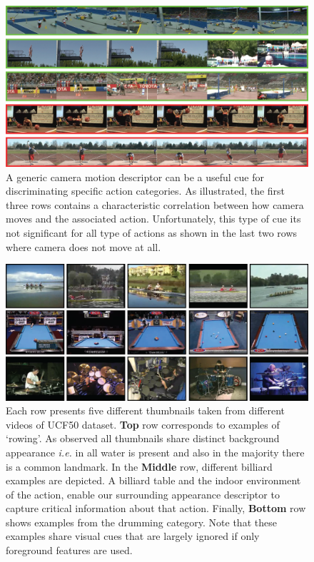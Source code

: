 \documentclass[runningheads]{llncs}
\begin{document}
\begin{figure}[t!]
\begin{center}
\includegraphics[width=0.98\linewidth]{cam_motion.png}
\end{center}
\caption{A generic camera motion descriptor can be a useful cue for discriminating specific action categories. As illustrated, the first three rows contains a characteristic correlation between how camera moves and the associated action. Unfortunately, this type of cue its not significant for all type of actions as shown in the last two rows where camera does not move at all.}
\label{fig:camMotion_example}
\end{figure}

\begin{figure}[t!]
\begin{center}
\includegraphics[width=0.98\linewidth]{sift.png}
\end{center}
\caption{Each row presents five different thumbnails taken from different videos of UCF50 dataset. \textbf{Top} row corresponds to examples of `rowing'. As observed all thumbnails share distinct background appearance \emph{i.e.} in all water is present and also in the majority there is a common landmark. In the \textbf{Middle} row, different billiard examples are depicted. A billiard table and the indoor environment of the action, enable our surrounding appearance descriptor to capture critical information about that action. Finally, \textbf{Bottom} row shows examples from the drumming category. Note that these examples share visual cues that are largely ignored if only foreground features are used.}
\label{fig:sift_example}
\end{figure}
\end{document}
